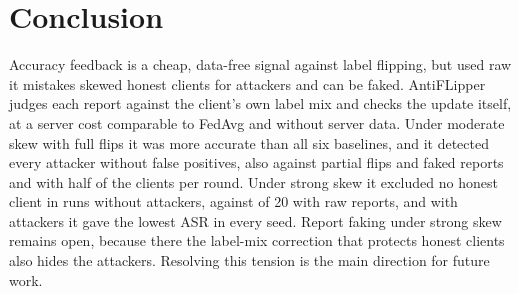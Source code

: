 \documentclass[conference]{IEEEtran}
\begin{document}
\section{Conclusion}
\label{sec:conclusion}
Accuracy feedback is a cheap, data-free signal against label flipping, but used raw it mistakes skewed honest clients for attackers and can be faked. AntiFLipper judges each report against the client's own label mix and checks the update itself, at a server cost comparable to FedAvg and without server data. Under moderate skew with full flips it was more accurate than all six baselines, and it detected every attacker without false positives, also against partial flips and faked reports and with half of the clients per round. Under strong skew it excluded no honest client in runs without attackers, against \cleanHonRaw{} of 20 with raw reports, and with attackers it gave the lowest ASR in every seed. Report faking under strong skew remains open, because there the label-mix correction that protects honest clients also hides the attackers. Resolving this tension is the main direction for future work.



\end{document}
